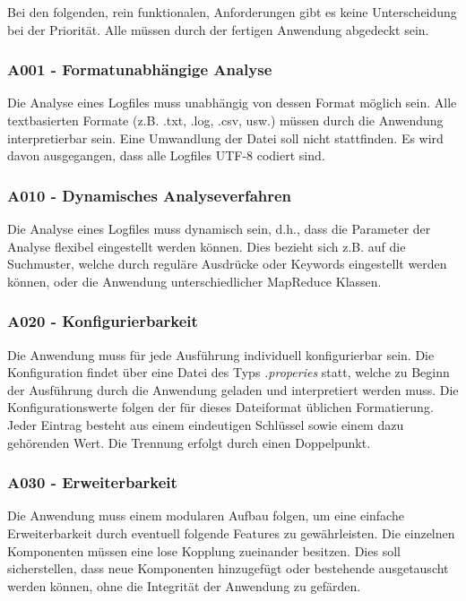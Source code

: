 Bei den folgenden, rein funktionalen, Anforderungen gibt es keine Unterscheidung bei der Priorität. Alle müssen durch der fertigen Anwendung abgedeckt sein.

\subsubsection{A001 - Formatunabhängige Analyse}\label{subsubsec:A001}
Die Analyse eines Logfiles muss unabhängig von dessen Format möglich sein. Alle textbasierten Formate (z.B. .txt, .log, .csv, usw.) müssen durch die Anwendung interpretierbar sein. Eine Umwandlung der Datei soll nicht stattfinden. Es wird davon ausgegangen, dass alle Logfiles UTF-8 codiert sind.

\subsubsection{A010 - Dynamisches Analyseverfahren}\label{subsubsec:A010}
Die Analyse eines Logfiles muss dynamisch sein, d.h., dass die Parameter der Analyse flexibel eingestellt werden können. Dies bezieht sich z.B. auf die Suchmuster, welche durch reguläre Ausdrücke oder Keywords eingestellt werden können, oder die Anwendung unterschiedlicher MapReduce Klassen.

\subsubsection{A020 - Konfigurierbarkeit}\label{subsubsec:A020}
Die Anwendung muss für jede  Ausführung individuell konfigurierbar sein. Die Konfiguration findet über eine Datei des Typs \textit{.properies} statt, welche zu Beginn der Ausführung durch die Anwendung geladen und interpretiert werden muss. Die Konfigurationswerte folgen der für dieses Dateiformat üblichen Formatierung. Jeder Eintrag besteht aus einem eindeutigen Schlüssel sowie einem dazu gehörenden Wert. Die Trennung erfolgt durch einen Doppelpunkt.

\subsubsection{A030 - Erweiterbarkeit}\label{subsubsec:A030}
Die Anwendung muss einem modularen Aufbau folgen, um eine einfache Erweiterbarkeit durch eventuell folgende Features zu gewährleisten. Die einzelnen Komponenten müssen eine lose Kopplung zueinander besitzen. Dies soll sicherstellen, dass neue Komponenten hinzugefügt oder bestehende ausgetauscht werden können, ohne die Integrität der Anwendung zu gefärden.

